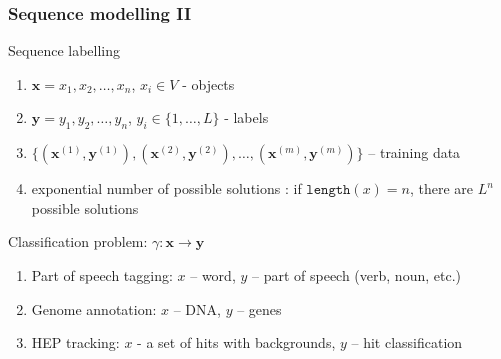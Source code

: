 \documentclass[usenames,dvipsnames,handout,aspectratio=169]{beamer}
\begin{document}
\begin{frame}
\frametitle{Sequence modelling II}

\begin{block}{Sequence labelling}

\begin{enumerate}


\item $\bm{x} = x_1,x_2,\ldots,x_n $, $x_i \in V$  - objects
\item $\bm{y} = y_1,y_2,\ldots,y_n $, $y_i \in \{1,\ldots, L\}$ - labels 
\item $ \{(\bm{x}^{(1)}, \bm{y}^{(1)} ), (\bm{x}^{(2)}, \bm{y}^{(2)} ),\ldots, (\bm{x}^{(m)}, \bm{y}^{(m)} ) \} $ – training data
\item exponential number of possible solutions : if $\texttt{length}(x) =n$, there are  $L^n$ possible solutions
\end{enumerate}

Classification problem: $ \gamma : \bm{x} \rightarrow \bm{y}$ 
	
\end{block}

\begin{enumerate}

	\item Part of speech tagging: $x$ – word, $y$ – part of speech (verb, noun, etc.)
	\item Genome annotation: $x$ – DNA, $y$ – genes
	\item HEP tracking: $x$ - a set of hits with backgrounds, $y$ – hit classification
 
\end{enumerate}

\end{frame}
\end{document}
